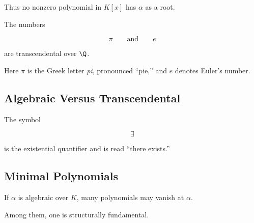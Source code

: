Thus no nonzero polynomial in \(K[x]\) has \(\alpha\) as a root.

The numbers

\[ \pi\qquad\text{and}\qquad e \]

are transcendental over \(\Q\).

Here \(\pi\) is the Greek letter \emph{pi}, pronounced ``pie,'' and \(e\)
denotes Euler's number.

\subsection{Algebraic Versus Transcendental}
\label{subsec:algebraic-transcendental-visual}

\begin{center}
\end{center}

The symbol

\[ \exists \]

is the existential quantifier and is read ``there exists.''

\subsection{Minimal Polynomials}
\label{subsec:minimal-polynomials}

If \(\alpha\) is algebraic over \(K\), many polynomials may vanish at
\(\alpha\).

Among them, one is structurally fundamental.

